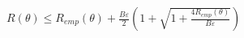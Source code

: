 \documentclass{standalone}
\begin{document}
$
\displaystyle
R(\theta)\le R_{emp}(\theta)+\frac{B\varepsilon}{2}\left(1+\sqrt{1+\frac{4R_{emp}(\theta)}{B\varepsilon}}\right)
$
\end{document}
